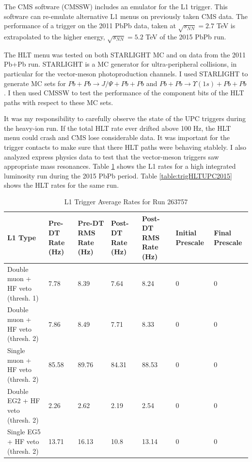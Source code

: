 The CMS software (CMSSW) includes an emulator for the L1 trigger. This software can re-emulate alternative L1 menus on previously taken CMS data. The performance of a trigger on the 2011 PbPb data, taken at $\sqrt{s_{NN}} = 2.7$ TeV is extrapolated to the higher energy, $\sqrt{s_{NN}} = 5.2$ TeV of the 2015 PbPb run.

The HLT menu was tested on both STARLIGHT MC and on data from the 2011 Pb+Pb run. STARLIGHT is a MC generator for ultra-peripheral collisions, in particular for the vector-meson photoproduction channels. I used STARLIGHT to generate MC sets for $Pb+Pb\rightarrow J/\Psi+Pb+Pb$ and $Pb+Pb\rightarrow \Upsilon(1s)+Pb+Pb$. I then used CMSSW to test the performance of the component bits of the HLT paths with respect to these MC sets. 

It was my responsibility to carefully observe the state of the UPC triggers during the heavy-ion run. If the total HLT rate ever drifted above 100 Hz, the HLT menu could crash and CMS lose considerable data. It was important for the trigger contacts to make sure that there HLT paths were behaving stablely. I also analyzed express physics data to test that the vector-meson triggers saw appropriate mass resonances. Table \ref{table:trigL1UPC2015} shows the L1 rates for a high integrated luminosity run during the 2015 PbPb period. Table \ref{table:trigHLTUPC2015} shows the HLT rates for the same run. 

\begin{table}[h!]
\centering
\caption{L1 Trigger Average Rates for Run 263757}
\label{table:trigL1UPC2015}
\begin{tabular}{@{}l|p{1.6cm}|p{1.6cm}|p{1.6cm}|p{1.6cm}|p{1.3cm}|p{1.3cm}|}
\toprule
L1 Type                           & Pre-DT Rate (Hz) & Pre-DT RMS Rate (Hz) & Post-DT Rate (Hz) & Post-DT RMS Rate (Hz) & Initial Prescale & Final Prescale \\ \midrule
Double muon + HF veto (thresh. 1) & 7.78             & 8.39                 & 7.64              & 8.24                  & 0                & 0              \\
Double muon + HF veto (thresh. 2) & 7.86             & 8.49                 & 7.71              & 8.33                  & 0                & 0              \\
Single muon + HF veto (thresh. 2) & 85.58            & 89.76                & 84.31             & 88.53                 & 0                & 0              \\
Double EG2 + HF veto (thresh. 2)  & 2.26             & 2.62                 & 2.19              & 2.54                  & 0                & 0              \\
Single EG5 + HF veto (thresh. 2)  & 13.71            & 16.13                & 10.8              & 13.14                 & 0                & 0              \\ \bottomrule
\end{tabular}
\end{table}


